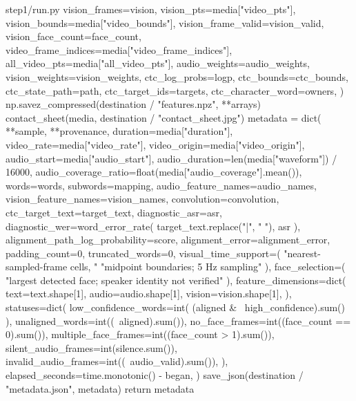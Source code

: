 \begin{appendices}
\begin{Python}{step1/run.py}
        vision_frames=vision,
        vision_pts=media["video_pts"],
        vision_bounds=media["video_bounds"],
        vision_frame_valid=vision_valid,
        vision_face_count=face_count,
        video_frame_indices=media["video_frame_indices"],
        all_video_pts=media["all_video_pts"],
        audio_weights=audio_weights,
        vision_weights=vision_weights,
        ctc_log_probs=logp,
        ctc_bounds=ctc_bounds,
        ctc_state_path=path,
        ctc_target_ids=targets,
        ctc_character_word=owners,
    )
    np.savez_compressed(destination / "features.npz", **arrays)
    contact_sheet(media, destination / "contact_sheet.jpg")
    metadata = dict(
        **sample,
        **provenance,
        duration=media["duration"],
        video_rate=media["video_rate"],
        video_origin=media["video_origin"],
        audio_start=media["audio_start"],
        audio_duration=len(media["waveform"]) / 16000,
        audio_coverage_ratio=float(media["audio_coverage"].mean()),
        words=words,
        subwords=mapping,
        audio_feature_names=audio_names,
        vision_feature_names=vision_names,
        convolution=convolution,
        ctc_target_text=target_text,
        diagnostic_asr=asr,
        diagnostic_wer=word_error_rate(
            target_text.replace("|", " "), asr
        ),
        alignment_path_log_probability=score,
        alignment_error=alignment_error,
        padding_count=0,
        truncated_words=0,
        visual_time_support=(
            "nearest-sampled-frame cells, "
            "midpoint boundaries; 5 Hz sampling"
        ),
        face_selection=(
            "largest detected face; speaker identity not verified"
        ),
        feature_dimensions=dict(
            text=text.shape[1],
            audio=audio.shape[1],
            vision=vision.shape[1],
        ),
        statuses=dict(
            low_confidence_words=int(
                (aligned & ~high_confidence).sum()
            ),
            unaligned_words=int((~aligned).sum()),
            no_face_frames=int((face_count == 0).sum()),
            multiple_face_frames=int((face_count > 1).sum()),
            silent_audio_frames=int(silence.sum()),
            invalid_audio_frames=int((~audio_valid).sum()),
        ),
        elapsed_seconds=time.monotonic() - began,
    )
    save_json(destination / "metadata.json", metadata)
    return metadata



\end{Python}
\end{appendices}
